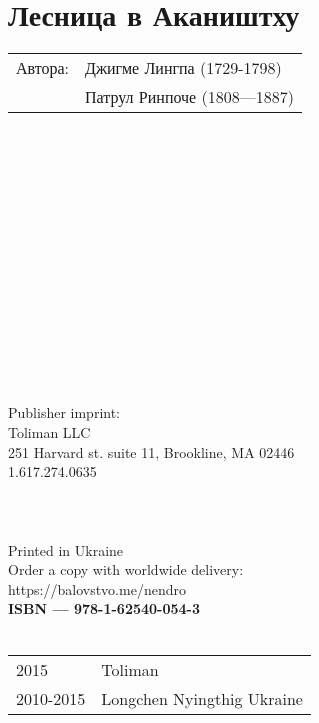 \section*{Лесница в Акаништху}

\begin{tabular}{ll}
Автора: & Джигме Лингпа (1729-1798)\\
       & Патрул Ринпоче (1808—1887)\\
\end{tabular}
\\
\\
\\
\\
\\
\\
\\
\\
\\
\\
\\
\\
\\
\\
Publisher imprint: \\
Toliman LLC \\
251 Harvard st. suite 11, Brookline, MA 02446 \\
1.617.274.0635 \\
\\
\\
\\
Printed in Ukraine \\

Order a copy with worldwide delivery: \\
https://balovstvo.me/nendro \\

{\bf  ISBN — 978-1-62540-054-3 \hspace{2em}} \\ \\

\begin{tabular}{ll}
\textcopyright{} 2015 & Toliman \\
\textcopyright{} 2010-2015 & Longchen Nyingthig Ukraine
\end{tabular}
